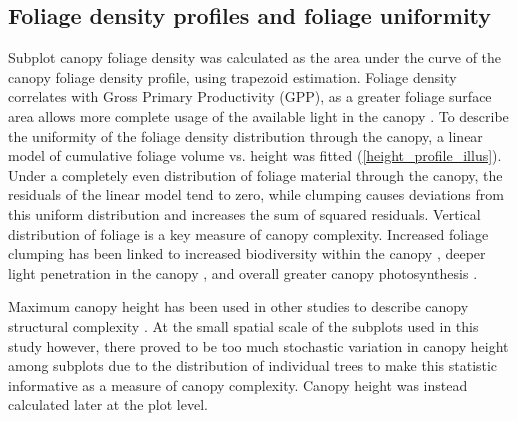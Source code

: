 \documentclass[11pt,a4paper]{article}
\begin{document}
\subsection{Foliage density profiles and foliage uniformity}

Subplot canopy foliage density was calculated as the area under the curve of the canopy foliage density profile, using trapezoid estimation. Foliage density correlates with Gross Primary Productivity (GPP), as a greater foliage surface area allows more complete usage of the available light in the canopy \citep{Kotchenova2004}. To describe the uniformity of the foliage density distribution through the canopy, a linear model of cumulative foliage volume vs. height was fitted (\autoref{height_profile_illus}). Under a completely even distribution of foliage material through the canopy, the residuals of the linear model tend to zero, while clumping causes deviations from this uniform distribution and increases the sum of squared residuals. Vertical distribution of foliage is a key measure of canopy complexity. Increased foliage clumping has been linked to increased biodiversity within the canopy \citep{Ishii2004}, deeper light penetration in the canopy \citep{Beland2021}, and overall greater canopy photosynthesis \citep{Baldocchi1986, Beland2021}.

Maximum canopy height has been used in other studies to describe canopy structural complexity \citep{Scheuermann2018}. At the small spatial scale of the subplots used in this study however, there proved to be too much stochastic variation in canopy height among subplots due to the distribution of individual trees to make this statistic informative as a measure of canopy complexity. Canopy height was instead calculated later at the plot level. 
\end{document}
